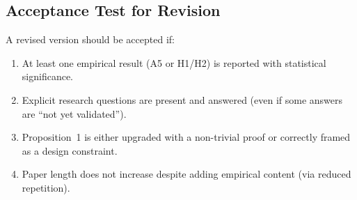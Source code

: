 \documentclass[11pt,a4paper]{article}
\begin{document}
\subsection{Acceptance Test for Revision}

A revised version should be accepted if:
\begin{enumerate}[nosep]
\item At least one empirical result (A5 or H1/H2) is reported with statistical significance.
\item Explicit research questions are present and answered (even if some answers are ``not yet validated'').
\item Proposition~1 is either upgraded with a non-trivial proof or correctly framed as a design constraint.
\item Paper length does not increase despite adding empirical content (via reduced repetition).
\end{enumerate}
\end{document}
